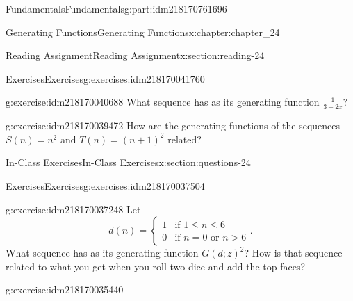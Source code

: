 \documentclass[oneside,10pt,]{book}
\numberwithin{equation}{section}
\newcommand{\gt}{>}
\begin{document}
\begin{partptx}{Fundamentals}{}{Fundamentals}{}{}{g:part:idm218170761696}
\begin{chapterptx}{Generating Functions}{}{Generating Functions}{}{}{x:chapter:chapter_24}
\begin{sectionptx}{Reading Assignment}{}{Reading Assignment}{}{}{x:section:reading-24}
\begin{exercises-subsection-numberless}{Exercises}{}{Exercises}{}{}{g:exercises:idm218170041760}
\begin{exercisegroup}
\begin{divisionexerciseeg}{1}{}{}{g:exercise:idm218170040688}
What sequence has as its generating function \(\frac{1}{3-2x}\)?%
\end{divisionexerciseeg}%
\begin{divisionexerciseeg}{2}{}{}{g:exercise:idm218170039472}%
How are the generating functions of the sequences \(S(n)=n^2\) and \(T(n)=(n+1)^2\) related?%
\end{divisionexerciseeg}%
\end{exercisegroup}
\par\medskip\noindent
\end{exercises-subsection-numberless}
\end{sectionptx}
%
%
\typeout{************************************************}
\typeout{************************************************}
%
\begin{sectionptx}{In-Class Exercises}{}{In-Class Exercises}{}{}{x:section:questions-24}
%
%
%
\typeout{************************************************}
\typeout{************************************************}
%
\begin{exercises-subsection-numberless}{Exercises}{}{Exercises}{}{}{g:exercises:idm218170037504}
\par\medskip\noindent%
%
\begin{exercisegroup}
\begin{divisionexerciseeg}{1}{}{}{g:exercise:idm218170037248}%
Let%
\begin{equation*}
d(n)=
\begin{cases}
1 & \textrm{if }1 \leq n \leq 6\\
0 & \textrm{if }n=0\textrm{ or }n \gt 6
\end{cases}.
\end{equation*}
What sequence has as its generating function \(G(d;z)^2\)?  How is that sequence related to what you get when you roll two dice and add the top faces?%
\end{divisionexerciseeg}%
\begin{divisionexerciseeg}{2}{}{}{g:exercise:idm218170035440}%

\end{divisionexerciseeg}
\end{exercisegroup}
\end{exercises-subsection-numberless}
\end{sectionptx}
\end{chapterptx}
\end{partptx}
\end{document}
